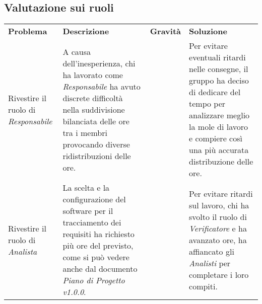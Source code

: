 \subsection{Valutazione sui ruoli}
\begin{table}[H]
	\renewcommand{\arraystretch}{1.5}
	\caption{Tabella delle problematiche relative ai ruoli}	
	\begin{longtable}{ >{\centering}p{} >{}p{}
			>{\centering}p{} >{}p{}}
			
		\rowcolorhead
		\textbf{\color{white}Problema} 
		& \textbf{\color{white}Descrizione} 
		& \centering\textbf{\color{white}Gravità}
		& \textbf{\color{white}Soluzione} 
		\tabularnewline %
		
		Rivestire il ruolo di \textit{Responsabile} &
		A causa dell'inesperienza, chi ha lavorato come \textit{Responsabile} ha avuto discrete
		difficoltà nella suddivisione bilanciata delle ore tra i membri provocando 
		diverse ridistribuzioni delle ore. &
		3 &
		Per evitare eventuali ritardi nelle consegne, il gruppo ha deciso di dedicare 
		del tempo per analizzare meglio la mole di lavoro e compiere così una più
		accurata distribuzione delle ore.
						
		\tabularnewline 
		Rivestire il ruolo di \textit{Analista} &
		La scelta e la configurazione del software per il tracciamento dei requisiti
		ha richiesto più ore del previsto, come si può vedere anche dal documento
		\textit{Piano di Progetto v1.0.0}. &
		2 &
		Per evitare ritardi sul lavoro, chi ha svolto il ruolo di \textit{Verificatore}
		e ha avanzato ore, ha affiancato gli \textit{Analisti} per completare 
		i loro compiti.
			
	\end{longtable}
	
\end{table}

